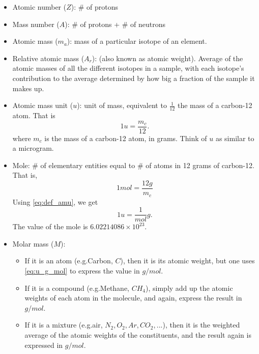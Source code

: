 \documentclass[oneside,a4paper,11pt]{report}
\begin{document}
\begin{itemize}

\item Atomic number ($Z$): \# of protons

\item Mass number ($A$): \# of protons + \# of neutrons

\item Atomic mass ($m_a$): mass of a particular isotope of an element.

\item Relative atomic mass ($A_r$): (also known as atomic weight). Average of the atomic masses of all the different isotopes in a sample, with each isotope's contribution to the average determined by how big a fraction of the sample it makes up.

\item Atomic mass unit ($u$): unit of mass, equivalent to $\frac{1}{12}$ the mass of a carbon-12 atom. That is 
\begin{equation}
\label{eq:def_amu}
1u = \frac{m_c}{12}.
\end{equation}
where $m_c$ is the mass of a carbon-12 atom, in grams. Think of $u$ as similar to a microgram.

\item Mole: \# of elementary entities equal to \# of atoms in 12 grams of carbon-12. That is,
\begin{equation}
1 mol = \frac{12g}{m_c}
\end{equation}
Using \cref{eq:def_amu}, we get
\begin{equation}
\label{eq:u_g_mol}
1u = \frac{1}{mol} g.
\end{equation}
The value of the mole is $6.02214086 \times 10^{23}$.

\item Molar mass ($M$): 
\begin{itemize}
    \item If it is an atom (e.g.\@ Carbon, $C$), then it is its atomic weight, but one uses \cref{eq:u_g_mol} to express the value in $g/mol$. 
    \item If it is a compound (e.g.\@ Methane, $CH_4$), simply add up the atomic weights of each atom in the molecule, and again, express the result in $g/mol$.
    \item If it is a mixture (e.g.\@ air, $N_2,O_2,Ar,CO_2,...$), then it is the weighted average of the atomic weights of the constituents, and the result again is expressed in $g/mol$.
\end{itemize}


\end{itemize}
\end{document}
